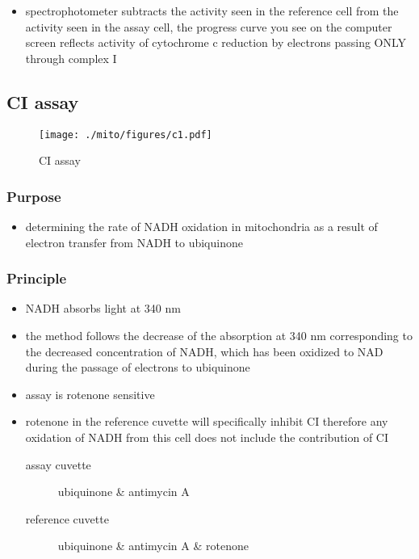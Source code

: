 \documentclass[12pt]{scrartcl}
\begin{document}
{\small{}}

\begin{itemize}
\item spectrophotometer subtracts the activity seen in the reference cell
from the activity seen in the assay cell, the progress curve you see
on the computer screen reflects activity of cytochrome c reduction
by electrons passing ONLY through complex I
\end{itemize}

\subsection{CI assay}
\label{sec:orgce37ba3}
\begin{figure}[htbp]
\centering
\texttt{[image: ./mito/figures/c1.pdf]}
\caption{\label{fig:org032a1f2}CI assay}
\end{figure}

\subsubsection{Purpose}
\label{sec:org9d95c7b}
\begin{itemize}
\item determining the rate of NADH oxidation in mitochondria as a result
of electron transfer from NADH to ubiquinone
\end{itemize}
\subsubsection{Principle}
\label{sec:org8d67989}
\begin{itemize}
\item NADH absorbs light at 340 nm
\item the method follows the decrease of the absorption at 340 nm
corresponding to the decreased concentration of NADH, which has been
oxidized to NAD during the passage of electrons to ubiquinone
\item assay is rotenone sensitive
\item rotenone in the reference cuvette will specifically inhibit CI
therefore any oxidation of NADH from this cell does not include the
contribution of CI
\begin{description}
\item[{assay cuvette}] ubiquinone \&  antimycin A
\item[{reference cuvette}] ubiquinone \&  antimycin A \& rotenone
\end{description}
\end{itemize}
\end{document}

